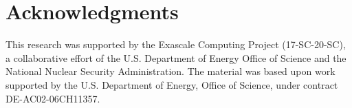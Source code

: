 \documentclass{anstrans}
\begin{document}
\section{Acknowledgments}

This research was supported by the Exascale Computing Project (17-SC-20-SC), a
collaborative effort of the U.S. Department of Energy Office of Science and the
National Nuclear Security Administration. The material was based upon work supported by the 
U.S. Department of Energy, Office of Science, under
contract DE-AC02-06CH11357.



\end{document}
